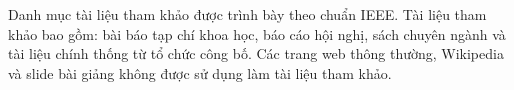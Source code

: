 \documentclass[../DoAn.tex]{subfiles}
\begin{document}
Danh mục tài liệu tham khảo được trình bày theo chuẩn IEEE. Tài liệu tham khảo bao gồm: bài báo tạp chí khoa học, báo cáo hội nghị, sách chuyên ngành và tài liệu chính thống từ tổ chức công bố. Các trang web thông thường, Wikipedia và slide bài giảng không được sử dụng làm tài liệu tham khảo.
\end{document}
